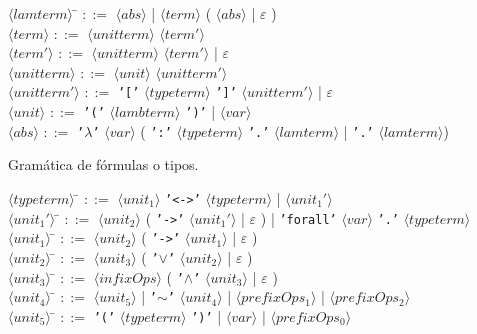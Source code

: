 \documentclass[a4paper,11pt]{article}
\begin{document}
\begin{tabbing}
$\langle lamterm \rangle$ \= $::=$ $\langle abs \rangle$ | $\langle term \rangle$ ( $\langle abs \rangle$ | $\varepsilon$ ) \\

$\langle term \rangle$ \> $::=$ $\langle unitterm \rangle$ $\langle term' \rangle$ \\

$\langle term' \rangle$ \> $::=$  $\langle unitterm \rangle$  $\langle term' \rangle$ | $\varepsilon$ \\

$\langle unitterm \rangle$ \> $::=$ $\langle unit \rangle$ $\langle unitterm' \rangle$ \\

$\langle unitterm' \rangle$ \> $::=$ \texttt{'['} $\langle typeterm \rangle$ \texttt{']'} $\langle unitterm' \rangle$ | $\varepsilon$ \\

$\langle unit \rangle$ \> $::=$ \texttt{'('} $\langle lambterm \rangle$ \texttt{')'} | $\langle var \rangle$ \\

$\langle abs \rangle$ \> $::=$ \texttt{'$\lambda$'} $\langle var \rangle$ ( \texttt{':'} $\langle typeterm \rangle$ \texttt{'.'} $\langle lamterm \rangle$
| \texttt{'.'} $\langle lamterm \rangle$)
\end{tabbing}

Gramática de fórmulas o tipos.

\begin{tabbing}
$\langle typeterm \rangle$ \= $::=$ $\langle unit_{1} \rangle$ \texttt{'<->'} $\langle typeterm \rangle$ | $\langle unit_{1}' \rangle$\\
$\langle unit_{1}' \rangle$ \= $::=$ $\langle unit_{2} \rangle$ ( \texttt{'->'} $\langle unit_{1}' \rangle$ | $\varepsilon$ ) 
| \texttt{'forall'} $\langle var \rangle$ \texttt{'.'} $\langle typeterm \rangle$\\
$\langle unit_{1} \rangle$ \= $::=$ $\langle unit_{2} \rangle$ ( \texttt{'->'} $\langle unit_{1} \rangle$ | $\varepsilon$ ) \\
$\langle unit_{2} \rangle$ \= $::=$ $\langle unit_{3} \rangle$ ( \texttt{'$\vee$'} $\langle unit_{2} \rangle$ | $\varepsilon$ ) \\
$\langle unit_{3} \rangle$ \= $::=$ $\langle infixOps \rangle$ ( \texttt{'$\wedge$'} $\langle unit_{3} \rangle$ | $\varepsilon$ ) \\
$\langle unit_{4} \rangle$ \= $::=$ $\langle unit_{5} \rangle$ | \texttt{'$\sim$'} $\langle unit_{4} \rangle$ |
$\langle prefixOps_{1} \rangle$ | $\langle prefixOps_{2} \rangle$ \\
$\langle unit_{5} \rangle$ \= $::=$ \texttt{'('} $\langle typeterm \rangle$ \texttt{')'} | $\langle var \rangle$ | 
$\langle prefixOps_{0} \rangle$

\end{tabbing}
\end{document}
